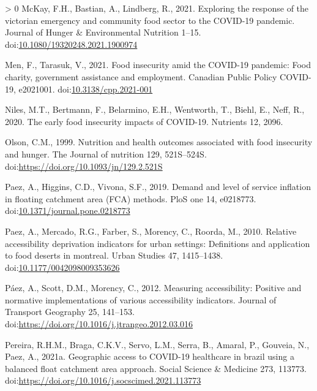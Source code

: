 \documentclass[]{elsarticle} %
\newlength{\cslhangindent}
\newenvironment{CSLReferences}[3] %
 {%
  \setlength{\parindent}{0pt}
  \ifodd #1 \everypar{\setlength{\hangindent}{\cslhangindent}}\ignorespaces\fi
  \ifnum #2 > 0
  \setlength{\parskip}{#2\baselineskip}
  \fi
 }%
 {}
\begin{document}
\begin{CSLReferences}{1}{0}
\leavevmode\hypertarget{ref-mckay2021exploring}{}%
McKay, F.H., Bastian, A., Lindberg, R., 2021. Exploring the response of
the victorian emergency and community food sector to the COVID-19
pandemic. Journal of Hunger \& Environmental Nutrition 1--15.
doi:\href{https://doi.org/10.1080/19320248.2021.1900974}{10.1080/19320248.2021.1900974}

\leavevmode\hypertarget{ref-men2021food}{}%
Men, F., Tarasuk, V., 2021. Food insecurity amid the COVID-19 pandemic:
Food charity, government assistance and employment. Canadian Public
Policy COVID-19, e2021001.
doi:\href{https://doi.org/10.3138/cpp.2021-001}{10.3138/cpp.2021-001}

\leavevmode\hypertarget{ref-niles2020early}{}%
Niles, M.T., Bertmann, F., Belarmino, E.H., Wentworth, T., Biehl, E.,
Neff, R., 2020. The early food insecurity impacts of COVID-19. Nutrients
12, 2096.

\leavevmode\hypertarget{ref-olson1999nutrition}{}%
Olson, C.M., 1999. Nutrition and health outcomes associated with food
insecurity and hunger. The Journal of nutrition 129, 521S--524S.
doi:\url{https://doi.org/10.1093/jn/129.2.521S}

\leavevmode\hypertarget{ref-paez2019demand}{}%
Paez, A., Higgins, C.D., Vivona, S.F., 2019. Demand and level of service
inflation in floating catchment area (FCA) methods. PloS one 14,
e0218773.
doi:\href{https://doi.org/10.1371/journal.pone.0218773}{10.1371/journal.pone.0218773}

\leavevmode\hypertarget{ref-paez2010relative}{}%
Paez, A., Mercado, R.G., Farber, S., Morency, C., Roorda, M., 2010.
Relative accessibility deprivation indicators for urban settings:
Definitions and application to food deserts in montreal. Urban Studies
47, 1415--1438.
doi:\href{https://doi.org/10.1177/0042098009353626}{10.1177/0042098009353626}

\leavevmode\hypertarget{ref-paez2012measuring}{}%
Páez, A., Scott, D.M., Morency, C., 2012. Measuring accessibility:
Positive and normative implementations of various accessibility
indicators. Journal of Transport Geography 25, 141--153.
doi:\url{https://doi.org/10.1016/j.jtrangeo.2012.03.016}

\leavevmode\hypertarget{ref-pereira2021geographic}{}%
Pereira, R.H.M., Braga, C.K.V., Servo, L.M., Serra, B., Amaral, P.,
Gouveia, N., Paez, A., 2021a. Geographic access to COVID-19 healthcare
in brazil using a balanced float catchment area approach. Social Science
\& Medicine 273, 113773.
doi:\url{https://doi.org/10.1016/j.socscimed.2021.113773}


\end{CSLReferences}
\end{document}
